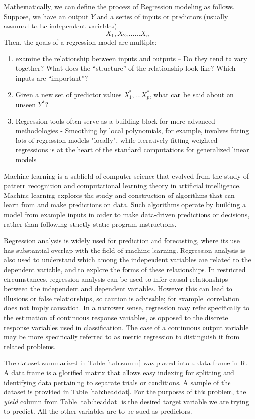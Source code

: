 \documentclass[conference]{IEEEtran}
\begin{document}
Mathematically, we can define the process of Regression modeling as follows. Suppose, we have an output $Y$ and a series of inputs or predictors (usually assumed to be independent variables). $$X_1, X_2, ...... X_n$$
Then, the goals of a regression model are multiple:
\begin{enumerate}
    \item {examine the relationship between inputs and outputs -- Do they tend to vary together? What does the “structure” of the relationship look like? Which inputs are “important”?}
    \item{ Given a new set of predictor values $X^{*}_1,...X^{*}_p$, what can be said about an unseen $Y^{*}$?}
    \item { Regression tools often serve as a building block for more advanced methodologies - Smoothing by local polynomials, for example, involves fitting lots of regression models "locally", while iteratively fitting weighted regressions is at the heart of the standard computations for generalized linear models}
\end{enumerate}
Machine learning is a subfield of computer science that evolved from the study of pattern recognition and computational learning theory in artificial intelligence. Machine learning explores the study and construction of algorithms that can learn from and make predictions on data. Such algorithms operate by building a model from example inputs in order to make data-driven predictions or decisions, rather than following strictly static program instructions.

Regression analysis is widely used for prediction and forecasting, where its use has substantial overlap with the field of machine learning. Regression analysis is also used to understand which among the independent variables are related to the dependent variable, and to explore the forms of these relationships. In restricted circumstances, regression analysis can be used to infer causal relationships between the independent and dependent variables. However this can lead to illusions or false relationships, so caution is advisable; for example, correlation does not imply causation. In a narrower sense, regression may refer specifically to the estimation of continuous response variables, as opposed to the discrete response variables used in classification. The case of a continuous output variable may be more specifically referred to as metric regression to distinguish it from related problems.

The dataset summarized in Table \ref{tab:summ} was placed into a data frame in R. A data frame is a glorified matrix that allows easy indexing for splitting and identifying data pertaining to separate trials or conditions. A sample of the dataset is provided in Table \ref{tab:headdat}. For the purposes of this problem, the \emph{yield} column from Table \ref{tab:headdat} is the desired target variable we are trying to predict. All the other variables are to be sued as predictors.
\end{document}
